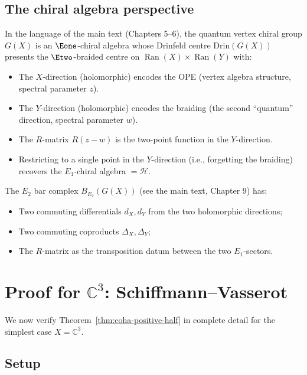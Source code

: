 \documentclass[11pt]{article}
\theoremstyle{definition}
\theoremstyle{remark}
\newcommand{\CC}{\mathbb{C}}
\newcommand{\CoHA}{\mathcal{H}}
\newcommand{\Ran}{\operatorname{Ran}}
\begin{document}
\subsection{The chiral algebra perspective}
\label{subsec:chiral-perspective}

In the language of the main text (Chapters 5--6), the quantum vertex chiral
group $G(X)$ is an $\Eone$-chiral algebra whose Drinfeld centre
$\mathrm{Drin}(G(X))$ presents the $\Etwo$-braided centre on
$\Ran(X) \times \Ran(Y)$ with:

\begin{itemize}
 \item The $X$-direction (holomorphic) encodes the OPE (vertex algebra
 structure, spectral parameter $z$).
 \item The $Y$-direction (holomorphic) encodes the braiding (the second
 ``quantum'' direction, spectral parameter $w$).
 \item The $R$-matrix $R(z-w)$ is the two-point function in the $Y$-direction.
 \item Restricting to a single point in the $Y$-direction (i.e., forgetting
 the braiding) recovers the $E_1$-chiral algebra $= \CoHA$.
\end{itemize}

\noindent
The $E_2$ bar complex $B_{E_2}(G(X))$ (see the main text, Chapter 9) has:
\begin{itemize}
 \item Two commuting differentials $d_X, d_Y$ from the two holomorphic
 directions;
 \item Two commuting coproducts $\Delta_X, \Delta_Y$;
 \item The $R$-matrix as the transposition datum between the two
 $E_1$-sectors.
\end{itemize}


\section{Proof for $\CC^3$: Schiffmann--Vasserot}
\label{sec:proof-c3}

We now verify Theorem~\ref{thm:coha-positive-half} in complete detail for
the simplest case $X = \CC^3$.

\subsection{Setup}
\label{subsec:c3-setup}
\end{document}
